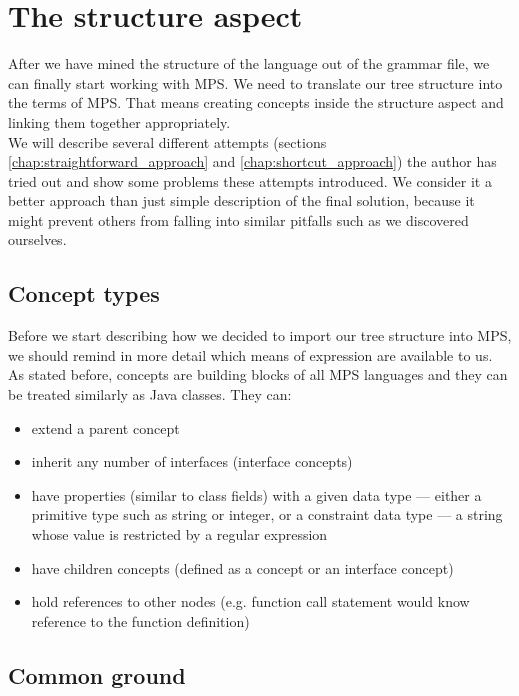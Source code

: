 \section{The structure aspect}

After we have mined the structure of the language out of the grammar file, we can finally start working with MPS.
We need to translate our tree structure into the terms of MPS.
That means creating concepts inside the structure aspect and linking them together appropriately.
\\

We will describe several different attempts (sections \ref{chap:straightforward_approach} and \ref{chap:shortcut_approach}) the author has tried out and show some problems these attempts introduced.
We consider it a better approach than just simple description of the final solution, because it might prevent others from falling into similar pitfalls such as we discovered ourselves.


\subsection{Concept types}

Before we start describing how we decided to import our tree structure into MPS, we should remind in more detail which means of expression are available to us.
As stated before, concepts are building blocks of all MPS languages and they can be treated similarly as Java classes.
They can:

\begin{itemize}
	\item extend a parent concept
	\item inherit any number of interfaces (interface concepts)
	\item have properties (similar to class fields) with a given data type --- either a primitive type such as string or integer, or a constraint data type --- a string whose value is restricted by a regular expression
	\item have children concepts (defined as a concept or an interface concept)
	\item hold references to other nodes (e.g. function call statement would know reference to the function definition)
\end{itemize}

\subsection{Common ground}
\label{chap:common_ground}

